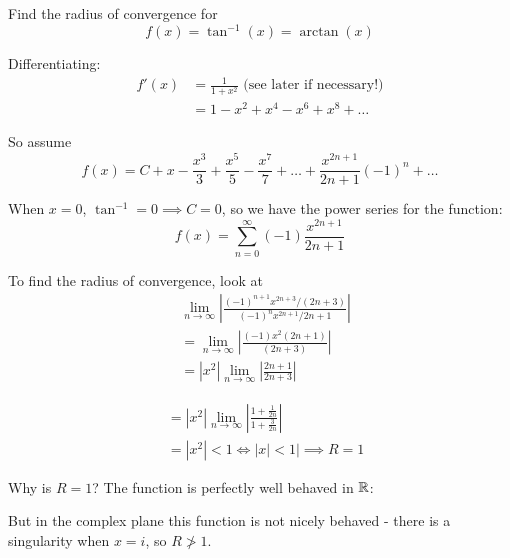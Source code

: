 \documentclass[10pt]{scrartcl}
\begin{document}
\begin{example}
Find the radius of convergence for 
\[f(x) = \tan^{-1}(x) = \arctan(x)\]

Differentiating: 
\[
\begin{aligned}
f'(x) &= \frac{1}{1+x^2} \text{ (see later if necessary!)}\\
&= 1 - x^2 + x^4 - x^6 + x^8 + \dots   
\end{aligned}
\]

So assume 
\[f(x) = C + x - \frac{x^3}{3} + \frac{x^5}{5} - \frac{x^7}{7} + \dots + \frac{x^{2n+1}}{2n+1}(-1)^n + \dots\]

When $x = 0$, $\tan^{-1} = 0 \implies C = 0$, so we have the power series for the function: 
\[f(x) = \sum_{n=0}^{\infty} (-1)\frac{x^{2n+1}}{2n+1}\]

To find the radius of convergence, look at 
\[
\begin{aligned}
  &\lim_{n\to \infty}\left|\frac{(-1)^{n+1}x^{2n+3}/(2n+3)}{(-1)^nx^{2n+1}/2n+1}\right|\\
  &= \lim_{n \to \infty} \left|\frac{(-1)x^2(2n+1)}{(2n+3)}\right|\\
  &= |x^2| \lim_{n\to \infty}\left|\frac{2n+1}{2n+3}\right| 
\end{aligned}
\]

\[
\begin{aligned}
    &= |x^2| \lim_{n\to \infty}\left|\frac{1 + \frac{1}{2n}}{1 + \frac{3}{2n}}\right|\\
  &= |x^2| < 1 \iff |x| < 1| \implies R = 1
\end{aligned}
\]


Why is $R = 1$? The function is perfectly well behaved in $\mathbb{R}$: \vspace*{-5pt}
\begin{center}
\end{center}

But in the complex plane this function is not nicely behaved - there is a singularity when $x = i$, so $R \not > 1$. 
\end{example}\vspace*{5pt}
\end{document}
